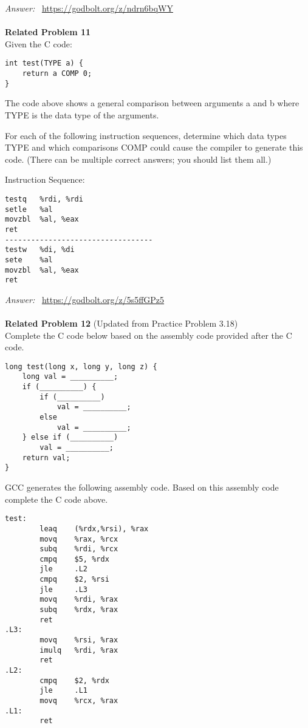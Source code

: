 \noindent\textit{Answer: }~\url{https://godbolt.org/z/ndrn6bqWY} \\
\\
\noindent\textbf{Related Problem 11}  \\
Given the C code:
\begin{verbatim}
int test(TYPE a) {
    return a COMP 0;
}
\end{verbatim}
The code above shows a general comparison between arguments a and b where TYPE is 
the data type of the arguments.

\noindent For each of the following instruction sequences, determine which data 
types TYPE and which comparisons COMP could cause the compiler to 
generate this code. (There can be multiple correct answers; you should 
list them all.)

\noindent Instruction Sequence:
\begin{verbatim}
testq   %rdi, %rdi
setle   %al
movzbl  %al, %eax
ret
----------------------------------
testw   %di, %di
sete    %al
movzbl  %al, %eax
ret
\end{verbatim}

\noindent\textit{Answer: }~\url{https://godbolt.org/z/5s5ffGPz5} \\
\\
\noindent\textbf{Related Problem 12} (Updated from Practice Problem 3.18) \\

Complete the C code below based on the assembly code provided after the C code.

\begin{verbatim}
long test(long x, long y, long z) {
    long val = __________;
    if (__________) {
        if (__________)
            val = __________;
        else
            val = __________;
    } else if (__________)
        val = __________;
    return val;
}
\end{verbatim}
GCC generates the following assembly code. Based on this assembly code complete 
the C code above.
\begin{verbatim}
test:
        leaq    (%rdx,%rsi), %rax
        movq    %rax, %rcx
        subq    %rdi, %rcx
        cmpq    $5, %rdx
        jle     .L2
        cmpq    $2, %rsi
        jle     .L3
        movq    %rdi, %rax
        subq    %rdx, %rax
        ret
.L3:
        movq    %rsi, %rax
        imulq   %rdi, %rax
        ret
.L2:
        cmpq    $2, %rdx
        jle     .L1
        movq    %rcx, %rax
.L1:
        ret
\end{verbatim}

